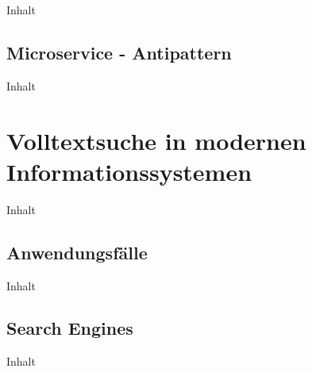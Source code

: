 Inhalt

\subsection{Microservice - Antipattern\label{subsec2.2.3:Unterunterpunkt-3}}

Inhalt

\section{Volltextsuche in modernen Informationssystemen\label{sec2.3:Unterpunkt-3}}

Inhalt

\subsection{Anwendungsfälle\label{subsec2.3.1:Unterunterpunkt-1}}

Inhalt

\subsection{Search Engines\label{subsec2.3.2:Unterunterpunkt-2}}

Inhalt
